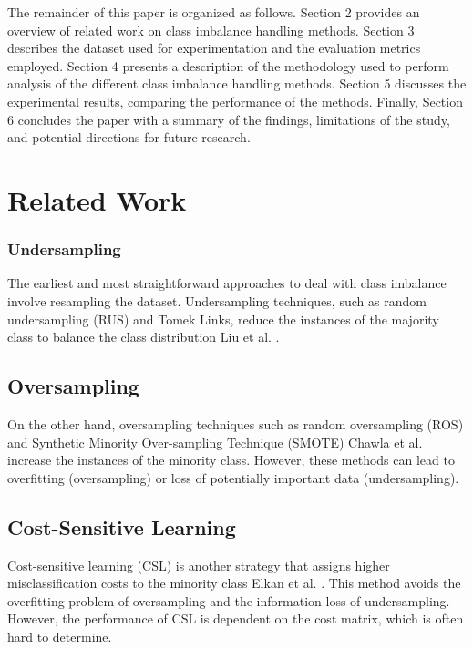\documentclass[journal]{IEEEtran}
\begin{document}
	The remainder of this paper is organized as follows. Section 2 provides an overview of related work on class imbalance handling methods. Section 3 describes the dataset used for experimentation and the evaluation metrics employed. Section 4 presents a description of the methodology used to perform analysis of the different class imbalance handling methods. Section 5 discusses the experimental results, comparing the performance of the methods. Finally, Section 6 concludes the paper with a summary of the findings, limitations of the study, and potential directions for future research.
	
	\section{Related Work}
	\label{sec:related_work}
	
	
	
	\subsubsection{Undersampling}
	
	
	
	
The earliest and most straightforward approaches to deal with class imbalance involve resampling the dataset. Undersampling techniques, such as random undersampling (RUS) and Tomek Links, reduce the instances of the majority class to balance the class distribution Liu et al. \cite{liu2009}. 

\subsection{Oversampling}

On the other hand, oversampling techniques such as random oversampling (ROS) and Synthetic Minority Over-sampling Technique (SMOTE) Chawla et al. \cite{chawla2002} increase the instances of the minority class. However, these methods can lead to overfitting (oversampling) or loss of potentially important data (undersampling).

\subsection{Cost-Sensitive Learning}

Cost-sensitive learning (CSL) is another strategy that assigns higher misclassification costs to the minority class Elkan et al. \cite{elkan2001}. This method avoids the overfitting problem of oversampling and the information loss of undersampling. However, the performance of CSL is dependent on the cost matrix, which is often hard to determine.
\end{document}

